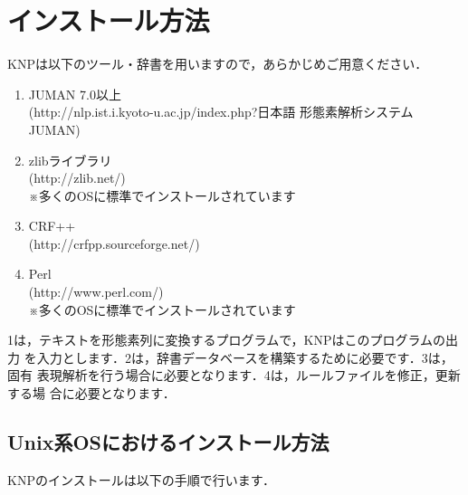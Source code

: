 \documentclass[a4j,11pt,titlepage]{jarticle}
\begin{document}
\section{インストール方法}

KNPは以下のツール・辞書を用いますので，あらかじめご用意ください．

\begin{enumerate}
 \item JUMAN 7.0以上 \\ (http://nlp.ist.i.kyoto-u.ac.jp/index.php?日本語
       形態素解析システムJUMAN)
 \item zlibライブラリ \\ (http://zlib.net/) \\
       ※多くのOSに標準でインストールされています
 \item CRF++ \\ (http://crfpp.sourceforge.net/)
 \item Perl \\ (http://www.perl.com/) \\
       ※多くのOSに標準でインストールされています
\end{enumerate}
1は，テキストを形態素列に変換するプログラムで，KNPはこのプログラムの出力
を入力とします．2は，辞書データベースを構築するために必要です．3は，固有
表現解析を行う場合に必要となります．4は，ルールファイルを修正，更新する場
合に必要となります．


\subsection{Unix系OSにおけるインストール方法}

KNPのインストールは以下の手順で行います．
\end{document}
